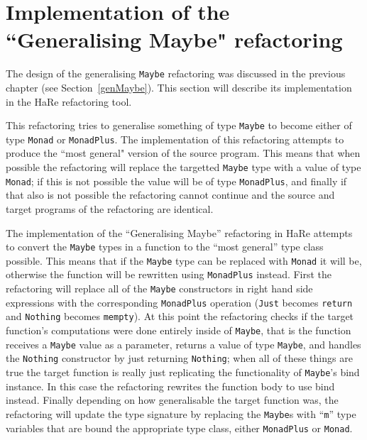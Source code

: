 \section{Implementation of the ``Generalising Maybe" refactoring}
\label{sec:genMaybeImp}

The design of the generalising \texttt{Maybe} refactoring was discussed in the previous chapter (see Section~\ref{genMaybe}). This section will describe its implementation in the HaRe refactoring tool. 

This refactoring tries to generalise something of type \texttt{Maybe} to become either of type \texttt{Monad} or \texttt{MonadPlus}. The implementation of this refactoring attempts to produce the ``most general" version of the source program. This means that when possible the refactoring will replace the targetted \texttt{Maybe} type with a value of type \texttt{Monad}; if this is not possible the value will be of type \texttt{MonadPlus}, and finally if that also is not possible the refactoring cannot continue and the source and target programs of the refactoring are identical.

The implementation of the ``Generalising Maybe'' refactoring in HaRe attempts to convert the \texttt{Maybe} types in a function to the ``most general'' type class possible. This means that if the \texttt{Maybe} type can be replaced with \texttt{Monad} it will be, otherwise the function will be rewritten using \texttt{MonadPlus} instead. First the refactoring will replace all of the \texttt{Maybe} constructors in right hand side expressions with the corresponding \texttt{MonadPlus} operation (\texttt{Just} becomes \texttt{return} and \texttt{Nothing} becomes \texttt{mempty}). At this point the refactoring checks if the target function's computations were done entirely inside of \texttt{Maybe}, that is the function receives a \texttt{Maybe} value as a parameter, returns a value of type \texttt{Maybe}, and handles the \texttt{Nothing} constructor by just returning \texttt{Nothing}; when all of these things are true the target function is really just replicating the functionality of \texttt{Maybe}'s bind instance. In this case the refactoring rewrites the function body to use bind instead. Finally depending on how generalisable the target function was, the refactoring will update the type signature by replacing the \texttt{Maybe}s with ``\texttt{m}'' type variables that are bound the appropriate type class, either \texttt{MonadPlus} or \texttt{Monad}.

